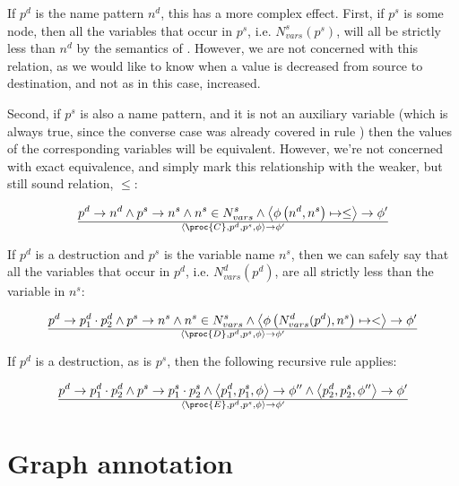 If $p^d$ is the name pattern $n^d$, this has a more complex effect. First, if
$p^s$ is some node, then all the variables that occur in $p^s$, i.e.
$N_{vars}^s(p^s)$, will all be strictly less than $n^d$ by the semantics of
\D{}. However, we are not concerned with this relation, as we would like to
know when a value is decreased from source to destination, and not as in this
case, increased.

Second, if $p^s$ is also a name pattern, and it is not an auxiliary variable
(which is always true, since the converse case was already covered in rule
) then the values of the corresponding
variables will be equivalent. However, we're not concerned with exact
equivalence, and simply mark this relationship with the weaker, but still sound
relation, $\leq$:

\begin{equation}
{
    p^d\rightarrow n^d
  \wedge
    p^s\rightarrow n^s
  \wedge
    n^s\in N_{vars}^s
  \wedge
    \left\langle\phi\left(n^d, n^s\right)\mapsto \leq\right\rangle\rightarrow\phi'
}\over{
  \left\langle\proc{C},p^d,p^s,\phi\right\rangle
  \rightarrow
  \phi'
}
\end{equation}

If $p^d$ is a destruction and $p^s$ is the variable name $n^s$, then we can safely say that
all the variables that occur in $p^d$, i.e. $N_{vars}^d(p^d)$, are all strictly less
than the variable in $n^s$:

\begin{equation}
{
    p^d\rightarrow p^d_1\cdot p^d_2
  \wedge
    p^s\rightarrow n^s
  \wedge
    n^s\in N_{vars}^s
  \wedge
    \left\langle\phi\left(N_{vars}^d(p^d), n^s\right)\mapsto <\right\rangle\rightarrow\phi'
}\over{
  \left\langle\proc{D},p^d,p^s,\phi\right\rangle
  \rightarrow
  \phi'
}
\end{equation}

If $p^d$ is a destruction, as is $p^s$, then the following recursive rule applies:

\begin{equation}
{
    p^d\rightarrow p^d_1\cdot p^d_2
  \wedge
    p^s\rightarrow p^s_1\cdot p^s_2
  \wedge
    \left\langle p^d_1, p^s_1, \phi\right\rangle
    \rightarrow
    \phi''
  \wedge
    \left\langle p^d_2, p^s_2, \phi''\right\rangle
    \rightarrow
    \phi'
}\over{
  \left\langle\proc{E},p^d,p^s,\phi\right\rangle
  \rightarrow
  \phi'
}
\end{equation}

\section{Graph annotation}

